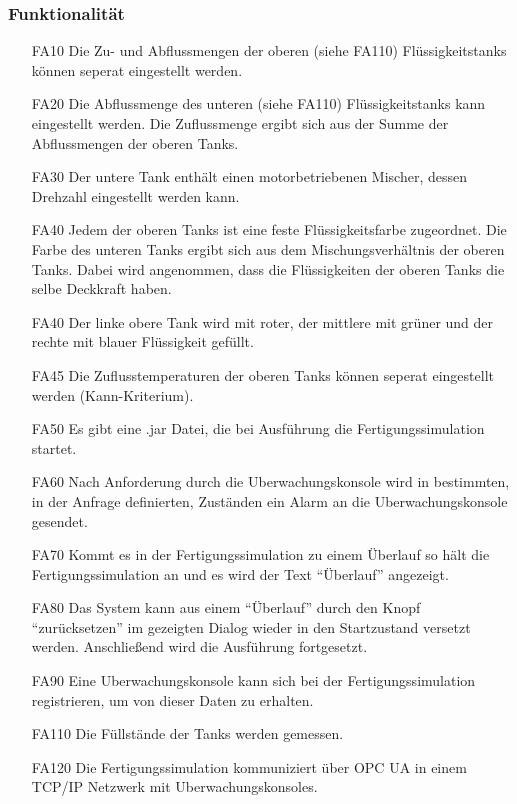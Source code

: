\documentclass[parskip=full]{scrartcl}
\begin{document}
\subsubsection{Funktionalität}
\begin{enumerate}
  \item[FA10] Die Zu- und Abflussmengen der oberen (siehe FA110) Flüssigkeitstanks können seperat eingestellt werden.
  \item[FA20] Die Abflussmenge des unteren (siehe FA110) Flüssigkeitstanks kann eingestellt werden. Die Zuflussmenge ergibt sich aus der Summe der Abflussmengen der oberen Tanks.
  \item[FA30] Der untere Tank enthält einen motorbetriebenen Mischer, dessen Drehzahl eingestellt werden kann.
  \item[FA40] Jedem der oberen Tanks ist eine feste Flüssigkeitsfarbe zugeordnet. Die Farbe des unteren Tanks ergibt sich aus dem Mischungsverhältnis der oberen Tanks. Dabei wird
    angenommen, dass die Flüssigkeiten der oberen Tanks die selbe Deckkraft haben.
  \item[FA40] Der linke obere Tank wird mit roter, der mittlere mit grüner und der rechte mit blauer Flüssigkeit gefüllt.
  \item[FA45] Die Zuflusstemperaturen der oberen Tanks können seperat eingestellt werden (Kann-Kriterium).
  \item[FA50] Es gibt eine .jar Datei, die bei Ausführung die \gls{Fertigungssimulation} startet.
  \item[FA60] Nach Anforderung durch die \gls{Uberwachungskonsole} wird in bestimmten, in der Anfrage definierten, Zust\"anden ein Alarm an die \gls{Uberwachungskonsole} gesendet.
  \item[FA70] Kommt es in der \gls{Fertigungssimulation} zu einem \"Uberlauf so h\"alt die \gls{Fertigungssimulation} an und es wird der Text "`\"Uberlauf"' angezeigt.
  \item[FA80] Das System kann aus einem "`\"Uberlauf"' durch den Knopf "`zur\"ucksetzen"' im gezeigten Dialog wieder in den Startzustand versetzt werden. Anschlie{\ss}end wird die Ausführung fortgesetzt.
  \item[FA90] Eine \gls{Uberwachungskonsole} kann sich bei der \gls{Fertigungssimulation} registrieren, um von dieser Daten zu erhalten.
  \item[FA110] Die Füllstände der Tanks werden gemessen.
  \item[FA120] Die \gls{Fertigungssimulation} kommuniziert über \gls{OPC UA} in einem \gls{TCP/IP} Netzwerk mit \glspl{Uberwachungskonsole}.

\end{enumerate}
\end{document}

